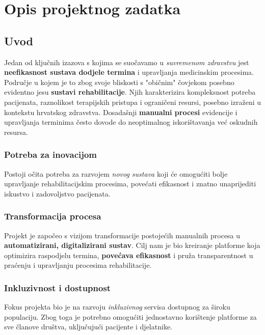 \chapter{Opis projektnog zadatka}
		
        \section*{Uvod}

        Jedan od ključnih izazova s kojima se suočavamo u \textit{suvremenom zdravstvu} jest \textbf{neefikasnost sustava dodjele termina} i upravljanja medicinskim procesima. Područje u kojem je to zbog svoje bliskosti s "običnim" čovjekom posebno evidentno jesu \textbf{sustavi rehabilitacije}. Njih karakterizira kompleksnost potreba pacijenata, raznolikost terapijskih pristupa i ograničeni resursi, posebno izraženi u kontekstu hrvatskog zdravstva. Dosadašnji \textbf{manualni procesi} evidencije i upravljanja terminima često dovode do neoptimalnog iskorištavanja već oskudnih resursa.
        
        \subsection*{\textbf{\large Potreba za inovacijom}}
        Postoji očita potreba za razvojem \textit{novog sustava} koji će omogućiti bolje upravljanje rehabilitacijskim procesima, povećati efikasnost i znatno unaprijediti iskustvo i zadovoljstvo pacijenata.
        
        \subsection*{\textbf{\large Transformacija procesa}}
        Projekt je započeo s vizijom transformacije postojećih manualnih procesa u \textbf{automatizirani, digitalizirani sustav}. Cilj nam je bio kreiranje platforme koja optimizira raspodjelu termina, \textbf{povećava efikasnost} i pruža transparentnost u praćenju i upravljanju procesima rehabilitacije.
        
        \subsection*{\textbf{\large Inkluzivnost i dostupnost}}
        Fokus projekta bio je na razvoju \textit{inkluzivnog} servisa dostupnog za široku populaciju. Zbog toga je potrebno omogućiti jednostavno korištenje platforme za sve članove društva, uključujući pacijente i djelatnike.
        
